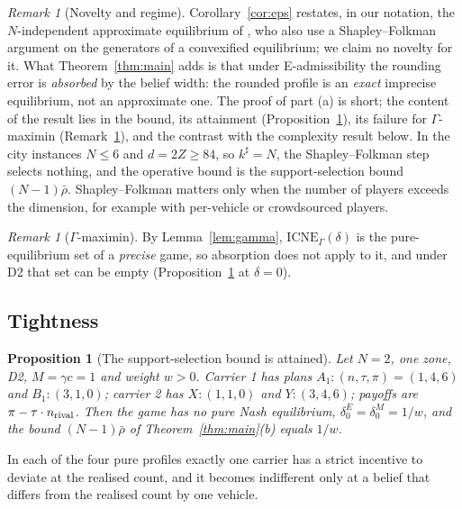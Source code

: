 \documentclass[preprint,12pt]{elsarticle}
\newtheorem{proposition}[theorem]{Proposition}
\theoremstyle{definition}
\theoremstyle{remark}
\newtheorem{remark}[theorem]{Remark}
\newcommand{\ICNE}{\mathrm{ICNE}}
\begin{document}
\begin{remark}[Novelty and regime]\label{rem:regime}
Corollary~\ref{cor:eps} restates, in our notation, the $N$-independent approximate equilibrium of \citet{Liu2023}, who also use a Shapley--Folkman argument on the generators of a convexified equilibrium; we claim no novelty for it. What Theorem~\ref{thm:main} adds is that under E-admissibility the rounding error is \emph{absorbed} by the belief width: the rounded profile is an \emph{exact} imprecise equilibrium, not an approximate one. The proof of part (a) is short; the content of the result lies in the bound, its attainment (Proposition~\ref{prop:tight}), its failure for $\Gamma$-maximin (Remark~\ref{rem:gamma-abs}), and the contrast with the complexity result below. In the city instances $N\le6$ and $d=2Z\ge84$, so $k^\sharp=N$, the Shapley--Folkman step selects nothing, and the operative bound is the support-selection bound $(N-1)\bar\rho$. Shapley--Folkman matters only when the number of players exceeds the dimension, for example with per-vehicle or crowdsourced players.
\end{remark}

\begin{remark}[$\Gamma$-maximin]\label{rem:gamma-abs}
By Lemma~\ref{lem:gamma}, $\ICNE_\Gamma(\delta)$ is the pure-equilibrium set of a \emph{precise} game, so absorption does not apply to it, and under D2 that set can be empty (Proposition~\ref{prop:tight} at $\delta=0$).
\end{remark}

\subsection{Tightness}

\begin{proposition}[The support-selection bound is attained]\label{prop:tight}
Let $N=2$, one zone, D2, $M=\gamma c=1$ and weight $w>0$. Carrier 1 has plans $A_1:(n,\tau,\pi)=(1,4,6)$ and $B_1:(3,1,0)$; carrier 2 has $X:(1,1,0)$ and $Y:(3,4,6)$; payoffs are $\pi-\tau\cdot n_{\rm rival}$. Then the game has no pure Nash equilibrium, $\delta_0^E=\delta_0^M=1/w$, and the bound $(N-1)\bar\rho$ of Theorem~\ref{thm:main}(b) equals $1/w$.
\end{proposition}

In each of the four pure profiles exactly one carrier has a strict incentive to deviate at the realised count, and it becomes indifferent only at a belief that differs from the realised count by one vehicle.
\end{document}
